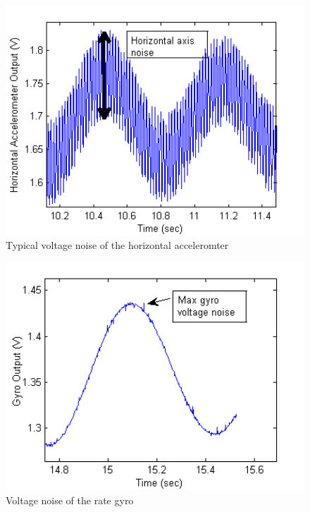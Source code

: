 \documentclass{article}
\theoremstyle{plain}
\theoremstyle{definition}
\theoremstyle{remark}
\begin{document}
\begin{figure}[hbt]
\begin{center}
\includegraphics[width = 12cm]{Example_Horizontal_Noise.png}
\caption{Typical voltage noise of the horizontal acceleromter}
\label{horizontalNoise}
\end{center}
\end{figure}

\begin{figure}[hbt]
\begin{center}
\includegraphics[width = 12cm]{Example_Gyro_Noise.png}
\caption{Voltage noise of the rate gyro}
\label{gyroNoise}
\end{center}
\end{figure}
\end{document}
